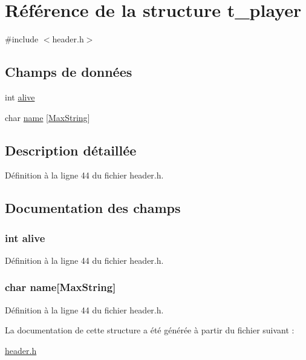 \hypertarget{structt__player}{\section{Référence de la structure t\-\_\-player}
\label{structt__player}
}


{\ttfamily \#include $<$header.\-h$>$}

\subsection*{Champs de données}
\begin{DoxyCompactItemize}
\item 
int \hyperlink{structt__player_afaea7716a081e71f804e80c2d5a92390}{alive}
\item 
char \hyperlink{structt__player_ab27f28c5ead39031421706ddbbd1edea}{name} \mbox{[}\hyperlink{header_8h_ab154998a3a376095f3601bc35c5cf523}{Max\-String}\mbox{]}
\end{DoxyCompactItemize}


\subsection{Description détaillée}


Définition à la ligne 44 du fichier header.\-h.



\subsection{Documentation des champs}
\hypertarget{structt__player_afaea7716a081e71f804e80c2d5a92390}{
\subsubsection[{alive}]{\setlength{\rightskip}{0pt plus 5cm}int alive}}\label{structt__player_afaea7716a081e71f804e80c2d5a92390}


Définition à la ligne 44 du fichier header.\-h.

\hypertarget{structt__player_ab27f28c5ead39031421706ddbbd1edea}{
\subsubsection[{name}]{\setlength{\rightskip}{0pt plus 5cm}char name\mbox{[}{\bf Max\-String}\mbox{]}}}\label{structt__player_ab27f28c5ead39031421706ddbbd1edea}


Définition à la ligne 44 du fichier header.\-h.



La documentation de cette structure a été générée à partir du fichier suivant \-:\begin{DoxyCompactItemize}
\item 
\hyperlink{header_8h}{header.\-h}\end{DoxyCompactItemize}

